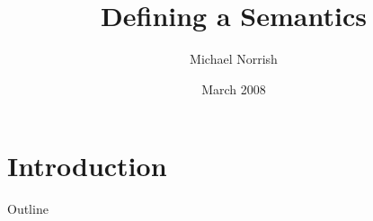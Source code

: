 \documentclass[compress,dvips,color=usenames,xcolor=dvipsnames]{beamer}
\title{Defining a \cpp{} Semantics}
\author{Michael Norrish}
\institute[NICTA]{Canberra Research Lab., NICTA}
\date{March 2008}
\begin{document}
\frame{\titlepage}
\section{Introduction}
\begin{frame}{Outline}\tableofcontents\end{frame}
\end{document}
